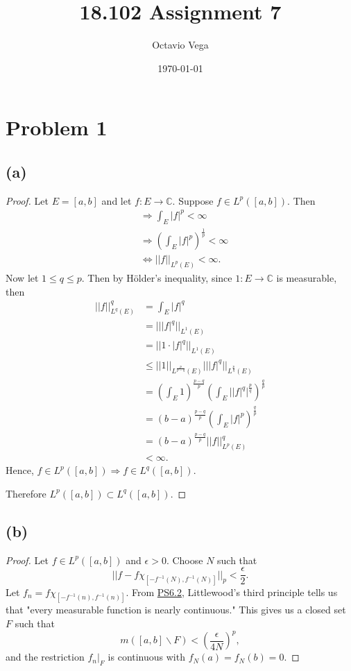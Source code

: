 \documentclass{article}
\title{18.102 Assignment 7}
\author{Octavio Vega}
\date\today
\newcommand{\C}{\mathbb{C}} %
\begin{document}
\maketitle
	
\section*{Problem 1}
\subsection*{(a)}
\begin{proof}
	Let $E = [a, b]$ and let $f: E \to \C$. Suppose $f \in L^p([a, b])$. Then
	\begin{align}
		&\Rightarrow \int_E |f|^p < \infty \\
		&\Rightarrow \left(\int_E |f|^p\right)^\frac{1}{p} < \infty \\
		&\iff ||f||_{L^p(E)} < \infty.
	\end{align}
	Now let $1 \leq q \leq p$. Then by Hölder's inequality, since $1: E \to \C$ is measurable, then
	\begin{align}
		||f||_{L^q(E)}^q &= \int_E |f|^q \\
		&= || |f|^q||_{L^1(E)} \\
		&= || 1 \cdot |f|^q||_{L^1(E)} \\
		& \leq ||1||_{L^{\frac{p}{p-q}}(E)} || |f|^q||_{L^{\frac{p}{q}}(E)} \\
		&= \left(\int_E 1\right)^{\frac{p-q}{p}} \left(\int_E \Big||f|^q\Big|^{\frac{p}{q}}\right)^{\frac{q}{p}} \\
		&= (b - a)^{\frac{p-q}{p}} \left(\int_E |f|^p\right)^{\frac{q}{p}} \\
		&= (b - a)^{\frac{p-q}{p}} ||f||_{L^p(E)}^q \\
		&< \infty.
	\end{align}
	Hence, $f \in L^p([a, b]) \Rightarrow f \in L^q ([a, b])$.
	
	Therefore $L^p([a, b]) \subset L^q([a, b])$. 
\end{proof}

\subsection*{(b)}
\begin{proof}
	Let $f \in L^p([a, b])$ and $\epsilon > 0$. Choose $N$ such that
	\begin{equation}
		||f - f \chi_{[-f^{-1}(N), f^{-1}(N)]}||_p < \frac{\epsilon}{2}.
	\end{equation}
	Let $f_n =f \chi_{[-f^{-1}(n), f^{-1}(n)]}$. From \href{https://github.com/ovega14/FunctionalAnalysis_solutions/blob/main/PS6/18.102_ps6.pdf}{PS6.2}, Littlewood's third principle tells us that "every measurable function is nearly continuous." This gives us a closed set $F$ such that
	\begin{equation}
		m([a, b] \backslash F) < \left(\frac{\epsilon}{4N}\right)^p,
	\end{equation}
	and the restriction $f_n \big|_F$ is continuous with $f_N(a) = f_N(b) = 0$.
\end{proof}
	
\end{document}
